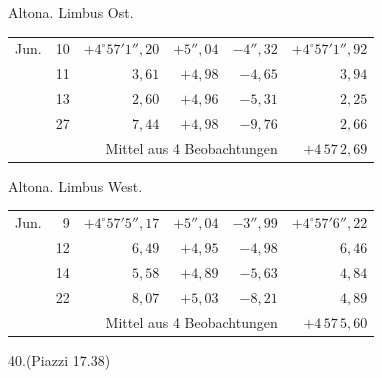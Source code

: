 \noindent\begin{minipage}[t]{.495\textwidth}\centering Altona. Limbus Ost.\par\smallskip
{\scriptsize\setlength{\tabcolsep}{1pt}\renewcommand{\arraystretch}{1.2}\begin{tabular}{lr|r|r|r|r|}
Jun.&10&$+4^\circ57'1''{,}20$&$+5''{,}04$&$-4''{,}32$&$+4^\circ57'1''{,}92$\\
&11&$3{,}61$&$+4{,}98$&$-4{,}65$&$3{,}94$\\
&13&$2{,}60$&$+4{,}96$&$-5{,}31$&$2{,}25$\\
&27&$7{,}44$&$+4{,}98$&$-9{,}76$&$2{,}66$\\
\cline{6-6}\multicolumn{5}{r}{Mittel aus 4 Beobachtungen}&$+4\,57\,2{,}69$
\end{tabular}}\end{minipage}\hfill\begin{minipage}[t]{.495\textwidth}\centering Altona. Limbus West.\par\smallskip
{\scriptsize\setlength{\tabcolsep}{1pt}\renewcommand{\arraystretch}{1.2}\begin{tabular}{lr|r|r|r|r}
Jun.&9&$+4^\circ57'5''{,}17$&$+5''{,}04$&$-3''{,}99$&$+4^\circ57'6''{,}22$\\
&12&$6{,}49$&$+4{,}95$&$-4{,}98$&$6{,}46$\\
&14&$5{,}58$&$+4{,}89$&$-5{,}63$&$4{,}84$\\
&22&$8{,}07$&$+5{,}03$&$-8{,}21$&$4{,}89$\\
\cline{6-6}\multicolumn{5}{r}{\raisebox{.3ex}{.}\,Mittel aus 4 Beobachtungen}&$+4\,57\,5{,}60$
\end{tabular}}\end{minipage}
\par\vspace{4mm}
\begin{center}40.\quad (Piazzi 17.38)\end{center}

